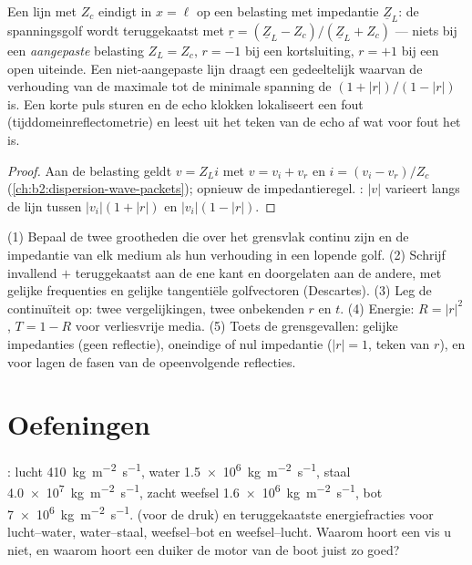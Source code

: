 \begin{proposition}\label{prop:b2:wave-interfaces:coax}
Een lijn met  $Z_c$ eindigt in $x = \ell$ op een
belasting met impedantie $\underline Z_L$: de spanningsgolf wordt
teruggekaatst met
$\underline r =
(\underline Z_L - Z_c)/(\underline Z_L + Z_c)$ --- niets bij
een \emph{aangepaste} belasting $Z_L = Z_c$, $r = -1$ bij een kortsluiting,
$r = +1$ bij een open uiteinde. Een niet-aangepaste lijn draagt een
gedeeltelijk  waarvan de verhouding van de maximale tot de
minimale spanning de \emph{} $(1 + |r|)/(1 - |r|)$ is.
Een korte puls sturen en de echo klokken lokaliseert een fout
(tijddomeinreflectometrie) en leest uit het teken van de echo af wat voor
fout het is.
\end{proposition}

\begin{proof}
Aan de belasting geldt $v = Z_Li$ met $v = v_i + v_r$ en
$i = (v_i - v_r)/Z_c$ (\cref{ch:b2:dispersion-wave-packets}); opnieuw de
impedantieregel. : $|v|$ varieert langs de lijn tussen
$|v_i|(1 + |r|)$ en $|v_i|(1 -
|r|)$.
\end{proof}

\begin{method}\label{met:b2:wave-interfaces:method}
(1) Bepaal de twee grootheden die over het grensvlak continu zijn en de
impedantie van elk medium als hun verhouding in een lopende golf. (2)
Schrijf invallend $+$ teruggekaatst aan de ene kant en doorgelaten aan de
andere, met gelijke frequenties en gelijke tangentiële golfvectoren
(Descartes). (3) Leg de continuïteit op: twee vergelijkingen, twee
onbekenden $r$ en $t$. (4) Energie: $R = |r|^2$, $T = 1 - R$ voor
verliesvrije media. (5) Toets de grensgevallen: gelijke impedanties (geen
reflectie), oneindige of nul impedantie ($|r| = 1$, teken van $r$), en voor
lagen de fasen van de opeenvolgende reflecties.
\end{method}

\section{Oefeningen}

\begin{exercise}[$\star$]\label{exo:b2:wave-interfaces:1}
: lucht \qty{410}{kg.m^{-2}.s^{-1}}, water
\qty{1.5e6}{kg.m^{-2}.s^{-1}}, staal \qty{4.0e7}{kg.m^{-2}.s^{-1}}, zacht
weefsel \qty{1.6e6}{kg.m^{-2}.s^{-1}}, bot \qty{7e6}{kg.m^{-2}.s^{-1}}.
 (voor de druk) en teruggekaatste energiefracties voor
lucht--water, water--staal, weefsel--bot en weefsel--lucht. Waarom hoort een
vis u niet, en waarom hoort een duiker de motor van de boot juist zo goed?
\end{exercise}

